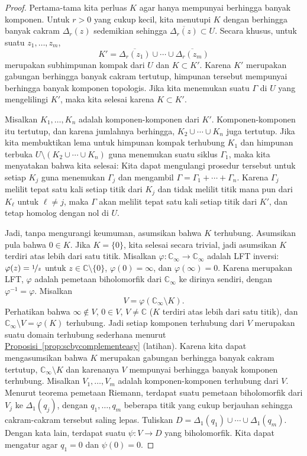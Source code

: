 \documentclass[12pt,openany]{book}
\newcommand{\C}{{\mathbb{C}}}
\theoremstyle{plain}
\theoremstyle{remark}
\theoremstyle{definition}
\theoremstyle{exercise}
\theoremstyle{example}
\newcommand{\propref}[1]{\hyperref[#1]{Proposisi~\ref*{#1}}}
\begin{document}
\begin{proof}
Pertama-tama kita perluas $K$ agar
hanya mempunyai berhingga banyak komponen. Untuk $r > 0$ yang cukup kecil, kita menutupi
$K$ dengan berhingga banyak cakram $\Delta_r(z)$ sedemikian sehingga $\overline{\Delta_r(z)}
\subset U$. Secara khusus, untuk suatu $z_1,\ldots,z_m$,
\begin{equation*}
K' =
\overline{\Delta_r(z_1)}
\cup \cdots \cup
\overline{\Delta_r(z_m)}
\end{equation*}
merupakan subhimpunan kompak dari $U$ dan $K \subset K'$.
Karena $K'$ merupakan gabungan berhingga banyak cakram tertutup, himpunan tersebut mempunyai
berhingga banyak komponen topologis.
Jika kita menemukan suatu $\Gamma$ di $U$ yang mengelilingi $K'$, maka kita selesai karena $K \subset K'$.

Misalkan $K_1,\ldots,K_n$ adalah komponen-komponen dari $K'$.
Komponen-komponen itu tertutup, dan karena jumlahnya berhingga,
$K_2 \cup \cdots \cup K_n$ juga tertutup.
Jika kita membuktikan lema untuk himpunan kompak terhubung $K_1$ dan
himpunan terbuka $U \setminus ( K_2 \cup \cdots \cup K_n )$ guna menemukan suatu siklus
$\Gamma_1$, maka kita menyatakan bahwa kita selesai: Kita dapat mengulangi prosedur tersebut
untuk setiap $K_j$ guna menemukan $\Gamma_j$ dan mengambil $\Gamma = \Gamma_1 + \cdots +
\Gamma_n$. Karena $\Gamma_j$ melilit tepat satu kali setiap titik dari $K_j$
dan tidak melilit titik mana pun dari $K_\ell$ untuk $\ell \neq j$,
maka $\Gamma$ akan melilit tepat satu kali setiap titik dari $K'$,
dan tetap homolog dengan nol di $U$.

Jadi, tanpa mengurangi keumuman, asumsikan bahwa $K$ terhubung.
Asumsikan pula bahwa $0 \in K$. Jika $K= \{0 \}$, kita selesai secara trivial, jadi
asumsikan $K$ terdiri atas lebih dari satu titik.
Misalkan $\varphi \colon \C_\infty \to \C_\infty$ adalah LFT inversi\@:
$\varphi(z) = \nicefrac{1}{z}$ untuk $z \in \C \setminus \{ 0 \}$,
$\varphi(0) = \infty$, dan $\varphi(\infty) = 0$.
Karena merupakan LFT, $\varphi$ adalah pemetaan biholomorfik dari
$\C_\infty$ ke dirinya sendiri, dengan $\varphi^{-1} = \varphi$. Misalkan
\begin{equation*}
V = \varphi(\C_\infty \setminus K) .
\end{equation*}
Perhatikan bahwa $\infty \notin V$, $0 \in V$, $V \neq \C$ ($K$ terdiri atas lebih dari satu
titik), dan
$\C_\infty \setminus V = \varphi(K)$ terhubung.
Jadi setiap komponen terhubung dari $V$ merupakan suatu domain terhubung sederhana
menurut \propref{prop:scbycomplementeasy} (latihan).
Karena kita dapat mengasumsikan bahwa $K$ merupakan gabungan berhingga banyak cakram tertutup,
$\C_\infty \setminus K$ dan karenanya $V$ mempunyai berhingga banyak komponen terhubung.
Misalkan $V_1,\ldots,V_m$ adalah komponen-komponen terhubung
dari $V$.
Menurut teorema pemetaan Riemann, terdapat
suatu pemetaan biholomorfik dari $V_j$ ke $\Delta_1(q_j)$,
dengan $q_1,\ldots,q_m$ beberapa titik yang
cukup berjauhan sehingga cakram-cakram tersebut saling lepas.
Tuliskan $D = \Delta_1(q_1) \cup \cdots \cup \Delta_1(q_m)$.
Dengan kata lain, terdapat
suatu $\psi \colon V \to D$ yang biholomorfik. Kita dapat mengatur agar $q_1=0$
dan $\psi(0)=0$.


\end{proof}
\end{document}
